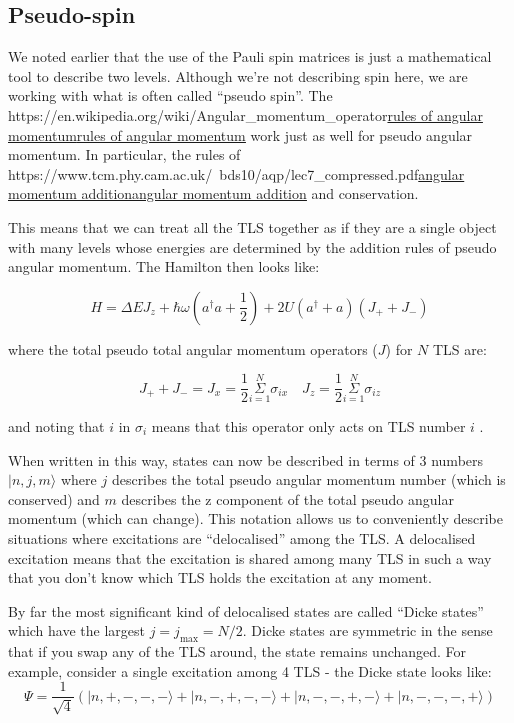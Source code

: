 \documentclass[
]{article}
\let\oldhref\href
\renewcommand{\href}[2]{\ifx#1\urlprefix\oldhref{#1}{#2}\else\uline{\oldhref{#1}{#2}}\fi}
\renewcommand{\[}{\begin{equation}}
\renewcommand{\]}{\end{equation}}
\begin{document}
\subsection{Pseudo-spin}\label{pseudo-spin}

We noted earlier that the use of the Pauli spin matrices is just a
mathematical tool to describe two levels. Although we're not describing
spin here, we are working with what is often called ``pseudo spin''. The
\href{https://en.wikipedia.org/wiki/Angular_momentum_operator}{rules of
angular momentum} work just as well for pseudo angular momentum. In
particular, the rules of
\href{https://www.tcm.phy.cam.ac.uk/~bds10/aqp/lec7_compressed.pdf}{angular
momentum addition} and conservation.

This means that we can treat all the TLS together as if they are a
single object with many levels whose energies are determined by the
addition rules of pseudo angular momentum. The Hamilton then looks like:

\[
H =  \Delta E J_{z} + \hbar\omega\left(a^{\dagger}a +\frac{1}{2}\right) + 2U\left( a^{\dagger} + a \right)(J_{+} + J_{-})
\label{eq:dickeHpseudo}
\]

where the total pseudo total angular momentum operators (\(J\)) for
\(N\) TLS are:

\[
J_{+} + J_{-} = J_{x} = \frac{1}{2}\overset{N}{\underset{i=1}{\Sigma}} \sigma_{i x} \,\,\,\,\,\, J_{z} = \frac{1}{2}\overset{N}{\underset{i=1}{\Sigma}} \sigma_{i z}
\]

and noting that \(i\) in \(\sigma_i\) means that this operator only acts
on TLS number \(i\) .

When written in this way, states can now be described in terms of 3
numbers \(|n, j, m\rangle\) where \(j\) describes the total pseudo
angular momentum number (which is conserved) and \(m\) describes the z
component of the total pseudo angular momentum (which can change). This
notation allows us to conveniently describe situations where excitations
are ``delocalised'' among the TLS. A delocalised excitation means that
the excitation is shared among many TLS in such a way that you don't
know which TLS holds the excitation at any moment.

By far the most significant kind of delocalised states are called
``Dicke states'' which have the largest \(j=j_{\max} = N/2\). Dicke
states are symmetric in the sense that if you swap any of the TLS
around, the state remains unchanged. For example, consider a single
excitation among 4 TLS - the Dicke state looks like: \[
\Psi = \frac{1}{\sqrt{4}}\left(| n, +, -, -, - \rangle + | n, -, +, -, - \rangle + | n, -, -, +, - \rangle + | n, -, -, -, + \rangle \right)
\]
\end{document}

